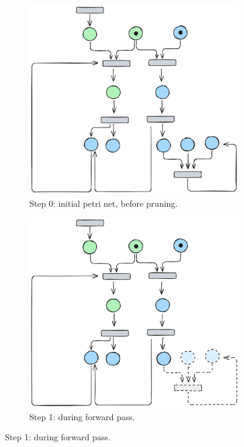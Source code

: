 \begin{figure}[htbp]
	\centering
	
	\begin{subfigure}[b]{0.45\textwidth}
		\centering
		\includegraphics[width=\textwidth]{plots/bidirectional_pruning_step_a_updated.pdf}
		\caption{Step 0: initial petri net, before pruning.}
		\label{fig:step:a}
	\end{subfigure}\hfill
	\begin{subfigure}[b]{0.45\textwidth}
		\centering
		\includegraphics[width=\textwidth]{plots/bidirectional_pruning_step_b_updated.pdf}
		\caption{Step 1: during forward pass.}
		\label{fig:step:b}
	\end{subfigure}
	

\end{figure}
